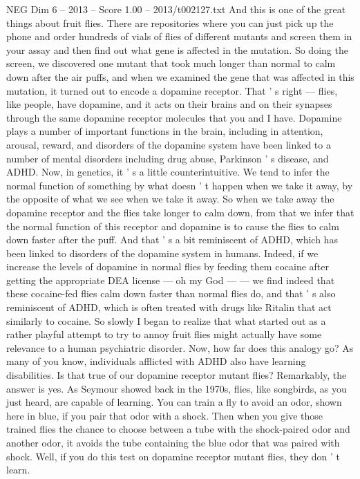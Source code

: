 \begin{textsample}{NEG Dim 6 – 2013 – Score 1.00 – 2013/t002127.txt}
And this is one of the great things about fruit flies.
There are repositories where you can just pick up the phone and order hundreds of vials of flies of different mutants and screen them in your assay and then find out what gene is affected in the mutation.
So doing the screen, we discovered one mutant that took much longer than normal to calm down after the air puffs, and when we examined the gene that was affected in this mutation, it turned out to encode a dopamine receptor.
That ' s right — flies, like people, have dopamine, and it acts on their brains and on their synapses through the same dopamine receptor molecules that you and I have.
Dopamine plays a number of important functions in the brain, including in attention, arousal, reward, and disorders of the dopamine system have been linked to a number of mental disorders including drug abuse, Parkinson ' s disease, and ADHD.
Now, in genetics, it ' s a little counterintuitive.
We tend to infer the normal function of something by what doesn ' t happen when we take it away, by the opposite of what we see when we take it away.
So when we take away the dopamine receptor and the flies take longer to calm down, from that we infer that the normal function of this receptor and dopamine is to cause the flies to calm down faster after the puff.
And that ' s a bit reminiscent of ADHD, which has been linked to disorders of the dopamine system in humans.
Indeed, if we increase the levels of dopamine in normal flies by feeding them cocaine after getting the appropriate DEA license — oh my God — — we find indeed that these cocaine-fed flies calm down faster than normal flies do, and that ' s also reminiscent of ADHD, which is often treated with drugs like Ritalin that act similarly to cocaine.
So slowly I began to realize that what started out as a rather playful attempt to try to annoy fruit flies might actually have some relevance to a human psychiatric disorder.
Now, how far does this analogy go?
As many of you know, individuals afflicted with ADHD also have learning disabilities.
Is that true of our dopamine receptor mutant flies?
Remarkably, the answer is yes.
As Seymour showed back in the 1970s, flies, like songbirds, as you just heard, are capable of learning.
You can train a fly to avoid an odor, shown here in blue, if you pair that odor with a shock.
Then when you give those trained flies the chance to choose between a tube with the shock-paired odor and another odor, it avoids the tube containing the blue odor that was paired with shock.
Well, if you do this test on dopamine receptor mutant flies, they don ' t learn.

\end{textsample}
